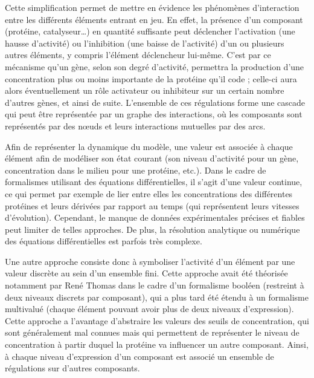 Cette simplification permet de mettre en évidence les phénomènes d'interaction entre
les différents éléments entrant en jeu.
En effet, la présence d'un composant (protéine, catalyseur…)
en quantité suffisante peut déclencher
l'activation (une hausse d'activité) ou l'inhibition (une baisse de l'activité)
d'un ou plusieurs autres éléments, y compris l'élément déclencheur lui-même.
C'est par ce mécanisme qu'un gène, selon son degré d'activité,
permettra la production d'une concentration plus ou moins importante de la protéine qu'il code ;
celle-ci aura alors éventuellement un rôle activateur ou inhibiteur sur un certain
nombre d'autres gènes, et ainsi de suite.
L'ensemble de ces régulations forme une cascade
qui peut être représentée par un graphe des interactions,
où les composants sont représentés par des nœuds et leurs interactions mutuelles par des arcs.


Afin de représenter la dynamique du modèle,
une valeur est associée à chaque élément afin de modéliser
son état courant
(son niveau d'activité pour un gène,
concentration dans le milieu pour une protéine, etc.).
Dans le cadre de formalismes utilisant des équations différentielles,
il s'agit d'une valeur continue,
ce qui permet par exemple de lier entre elles
les concentrations des différentes protéines et leurs dérivées par rapport au temps
(qui représentent leurs vitesses d'évolution). \toref
Cependant, le manque de données expérimentales précises et fiables peut limiter de telles
approches.
De plus, la résolution analytique ou numérique des équations différentielles est parfois
très complexe.

Une autre approche consiste donc à symboliser l'activité d'un élément par
une valeur discrète au sein d'un ensemble fini.
Cette approche avait été théorisée notamment par René Thomas 
dans le cadre d'un formalisme booléen (restreint à deux niveaux discrets par composant),
qui a plus tard été étendu à un formalisme multivalué
(chaque élément pouvant avoir plus de deux niveaux d'expression).
Cette approche a l'avantage d'abstraire les valeurs des seuils de concentration,
qui sont généralement mal connues
mais qui permettent de représenter le niveau de concentration
à partir duquel la protéine va influencer un autre composant.
Ainsi, à chaque niveau d'expression d'un composant est associé un ensemble de régulations
sur d'autres composants.

